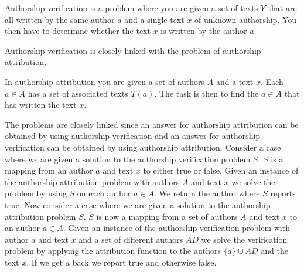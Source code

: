 \begin{definition}

    Authorship verification is a problem where you are given a set of texts $Y$
    that are all written by the same author $a$ and a single text $x$ of unknown
    authorship. You then have to determine whether the text $x$ is written by
    the author $a$.

\end{definition}

Authorship verification is closely linked with the problem of authorship
attribution,

\begin{definition}

    In authorship attribution you are given a set of authors $A$ and a text $x$.
    Each $a \in A$ has a set of associated texts $T(a)$. The task is then to
    find the $a \in A$ that has written the text $x$.

\end{definition}

The problems are closely linked since an answer for authorship attribution can
be obtained by using authorship verification and an answer for authorship
verification can be obtained by using authorship attribution. Consider a case
where we are given a solution to the authorship verification problem $S$. $S$ is
a mapping from an author $a$ and text $x$ to either true or false. Given an
instance of the authorship attribution problem with authors $A$ and text $x$ we
solve the problem by using $S$ on each author $a \in A$. We return the author
where $S$ reports true. Now consider a case where we are given a solution to the
authorship attribution problem $S$. $S$ is now a mapping from a set of authors
$A$ and text $x$ to an author $a \in A$. Given an instance of the authorship
verification problem with author $a$ and text $x$ and a set of different authors
$AD$ we solve the verification problem by applying the attribution function to
the authors $\{a\} \cup AD$ and the text $x$. If we get $a$ back we report
true and otherwise false.
